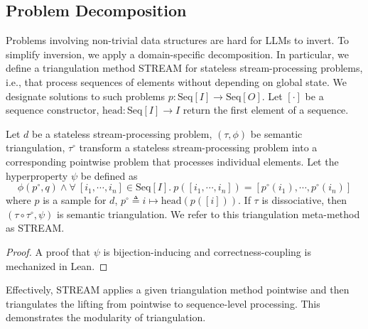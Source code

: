 \documentclass[acmsmall,screen,nonacm]{acmart}
\begin{document}
\subsection{Problem Decomposition}

Problems involving non-trivial data structures are hard for LLMs to invert. To simplify inversion, we apply a domain-specific decomposition. In particular, we define a triangulation method STREAM for stateless stream-processing problems, i.e., that process sequences of elements without depending on global state. We designate solutions to such problems $p: \mathrm{Seq}[I] \rightarrow \mathrm{Seq}[O]$. Let $[\cdot]$ be a sequence constructor, $\mathrm{head}: \mathrm{Seq}[I] \rightarrow I$ return the first element of a sequence.

\begin{proposition}[STREAM]\label{prop:stream}
  Let $d$ be a stateless stream-processing problem, $(\tau, \phi)$ be semantic triangulation, $\tau^{\circ}$ transform a stateless stream-processing problem into a corresponding pointwise problem that processes individual elements. Let the hyperproperty $\psi$ be defined as
\[
\phi(p^{\circ}, q) \wedge \forall\ [i_1, \cdots, i_n] \in \mathrm{Seq}[I].\ p([i_1, \cdots, i_n]) = [p^{\circ}(i_1), \cdots, p^{\circ}(i_n)]
\]
where $p$ is a sample for $d$, $p^{\circ}\triangleq i \mapsto \mathrm{head}(p([i]))$. If $\tau$ is dissociative, then $(\tau \circ \tau^{\circ}, \psi)$ is semantic triangulation. We refer to this triangulation meta-method as STREAM.
\end{proposition}

\begin{proof}
  A proof that $\psi$ is bijection-inducing and correctness-coupling is mechanized in Lean.
\end{proof}

\noindent Effectively, STREAM applies a given triangulation method pointwise and then triangulates the lifting from pointwise to sequence-level processing. This demonstrates the modularity of triangulation.

\end{document}
